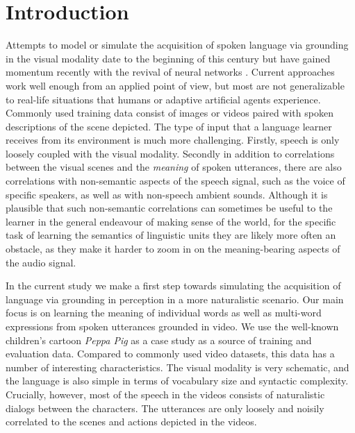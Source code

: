 \section{Introduction}
\label{sec:intro}

Attempts to model or simulate the acquisition of spoken language via
grounding in the visual modality date to the beginning of this century
\citep{roypentland2002learning} but have gained momentum recently
with the revival of neural networks
\citep[e.g.][]{synnaeve2014learning,harwath2015deep,
  harwath2016unsupervised,chrupala-etal-2017-representations,alishahi-etal-2017-encoding,harwath2018jointly,Merkx2019,havard2019models,rouditchenko2020avlnet,khorrami_2021,peng2021fastslow}.
Current approaches work well enough from an applied point of view, 
but most are not generalizable to real-life situations that humans or 
adaptive artificial agents experience. Commonly used training data
consist of images or videos paired with spoken descriptions
of the scene depicted. The type of input that a language learner receives 
from its environment is much more challenging.  Firstly, speech is only
loosely coupled with the visual modality. Secondly in addition to
correlations between the visual scenes and the {\it meaning} of spoken
utterances, there are also correlations with non-semantic aspects of
the speech signal, such as the voice of specific speakers, as well
as with non-speech ambient sounds. Although it is plausible that such
non-semantic correlations can sometimes be useful to the learner in
the general endeavour of making sense of the world, for the specific
task of learning the semantics of linguistic units they are likely more
often an obstacle, as they make it harder to zoom in on the
meaning-bearing aspects of the audio signal.

In the current study we make a first step towards simulating the
acquisition of language via grounding in perception in a more naturalistic
scenario.  Our main focus is on learning the meaning of individual words 
as well as multi-word expressions from spoken utterances grounded in video.  
We use the well-known children's cartoon {\it Peppa Pig} as
a case study as a source of training and evaluation data. Compared to
commonly used video datasets, this data has a number of interesting
characteristics.  The visual modality is very schematic, and the
language is also simple in terms of vocabulary size and syntactic
complexity. Crucially, however, most of the speech in the videos
consists of naturalistic dialogs between the characters. The
utterances are only loosely and noisily correlated to the scenes and
actions depicted in the videos.

